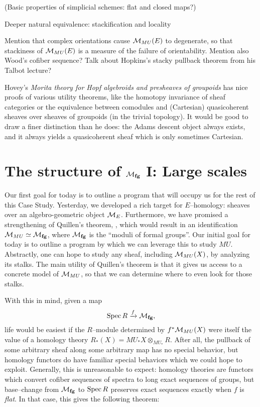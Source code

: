 (Basic properties of simplicial schemes: flat and closed maps?)




Deeper natural equivalence: stackification and locality

Mention that complex orientations cause $\mathcal{M}_{MU}(E)$ to degenerate, so that stackiness of $\mathcal{M}_{MU}(E)$ is a measure of the failure of orientability.  Mention also Wood's cofiber sequence?  Talk about Hopkins's stacky pullback theorem from his Talbot lecture?

Hovey's \textit{Morita theory for Hopf algebroids and presheaves of groupoids} has nice proofs of various utility theorems, like the homotopy invariance of sheaf categories or the equivalence between comodules and (Cartesian) quasicoherent sheaves over sheaves of groupoids (in the trivial topology).  It would be good to draw a finer distinction than he does: the Adams descent object always exists, and it always yields a quasicoherent sheaf which is only sometimes Cartesian.






\section{The structure of $\mathcal{M}_{\mathbf{fg}}$ I: Large scales}

Our first goal for today is to outline a program that will occupy us for the rest of this Case Study.  Yesterday, we developed a rich target for $E$--homology: sheaves over an algebro-geometric object $\mathcal{M}_{E}$.  Furthermore, we have promised a strengthening of Quillen's theorem, , which would result in an identification $\mathcal{M}_{MU} \simeq \mathcal{M}_{\mathbf{fg}}$, where $\mathcal{M}_{\mathbf{fg}}$ is the ``moduli of formal groups''.  Our initial goal for today is to outline a program by which we can leverage this to study $MU$.  Abstractly, one can hope to study any sheaf, including $\mathcal{M}_{MU}(X)$, by analyzing its stalks.  The main utility of Quillen's theorem is that it gives us access to a concrete model of $\mathcal{M}_{MU}$, so that we can determine where to even look for those stalks.

With this in mind, given a map \[\operatorname{Spec} R \xrightarrow{f} \mathcal{M}_{\mathbf{fg}},\] life would be easiest if the $R$--module determined by $f^* \mathcal{M}_{MU}(X)$ were itself the value of a homology theory $R_*(X) = MU_* X \otimes_{MU_*} R$.  After all, the pullback of some arbitrary sheaf along some arbitrary map has no special behavior, but homology functors do have familiar special behaviors which we could hope to exploit.  Generally, this is unreasonable to expect: homology theories are functors which convert cofiber sequences of spectra to long exact sequences of groups, but base--change from $\mathcal{M}_{\mathbf{fg}}$ to $\operatorname{Spec} R$ preserves exact sequences exactly when $f$ is \textit{flat}.  In that case, this gives the following theorem:

